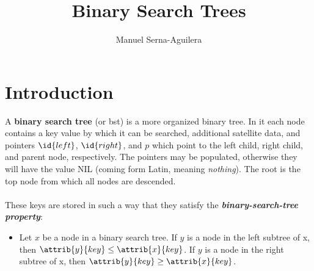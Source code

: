 \documentclass[12pt]{article}
\title{Binary Search Trees}
\author{Manuel Serna-Aguilera}
\date{}
\begin{document}
\maketitle

\section*{Introduction}
A \textbf{binary search tree} (or bst) is a more organized binary tree. In it each node contains a key value by which it can be searched, additional satellite data, and pointers $\id{left}$, $\id{right}$, and $p$ which point to the left child, right child, and parent node, respectively. The pointers may be populated, otherwise they will have the value NIL (coming form Latin, meaning \textit{nothing}). The root is the top node from which all nodes are descended. 
\\ \\
These keys are stored in such a way that they satisfy the \textbf{\emph{binary-search-tree property}}:

\begin{itemize}
    \item[] Let $x$ be a node in a binary search tree. If $y$ is a node in the left subtree of x, then $\attrib{y}{key} \leq \attrib{x}{key}$. If $y$ is a node in the right subtree of x, then $\attrib{y}{key} \geq \attrib{x}{key}$.
\end{itemize}
\end{document}
